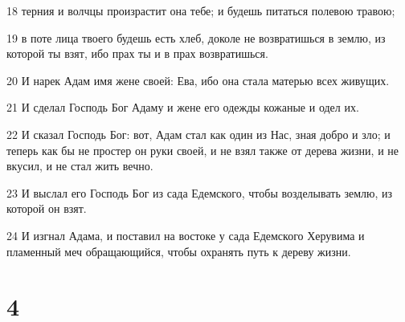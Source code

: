 \par 18 терния и волчцы произрастит она тебе; и будешь питаться полевою травою;
\par 19 в поте лица твоего будешь есть хлеб, доколе не возвратишься в землю, из которой ты взят, ибо прах ты и в прах возвратишься.
\par 20 И нарек Адам имя жене своей: Ева, ибо она стала матерью всех живущих.
\par 21 И сделал Господь Бог Адаму и жене его одежды кожаные и одел их.
\par 22 И сказал Господь Бог: вот, Адам стал как один из Нас, зная добро и зло; и теперь как бы не простер он руки своей, и не взял также от дерева жизни, и не вкусил, и не стал жить вечно.
\par 23 И выслал его Господь Бог из сада Едемского, чтобы возделывать землю, из которой он взят.
\par 24 И изгнал Адама, и поставил на востоке у сада Едемского Херувима и пламенный меч обращающийся, чтобы охранять путь к дереву жизни.

\chapter{4}


